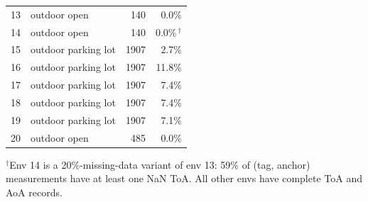 \begin{table}[t]
\begin{tabular}{l l r r}
13 & outdoor open             & 140   & 0.0\%  \\
14 & outdoor open             & 140   & 0.0\%\,$^{\dagger}$ \\
15 & outdoor parking lot      & 1907  & 2.7\%  \\
16 & outdoor parking lot      & 1907  & 11.8\% \\
17 & outdoor parking lot      & 1907  & 7.4\%  \\
18 & outdoor parking lot      & 1907  & 7.4\%  \\
19 & outdoor parking lot      & 1907  & 7.1\%  \\
20 & outdoor open             & 485   & 0.0\%  \\
\bottomrule
\end{tabular}

\smallskip
\noindent
\small
$^{\dagger}$Env 14 is a 20\%-missing-data variant of env 13:
59\% of (tag, anchor) measurements have at least one NaN ToA.
All other envs have complete ToA and AoA records.
\end{table}

